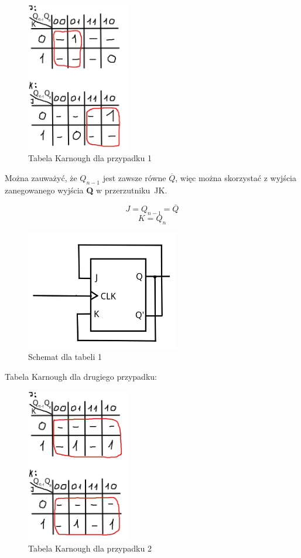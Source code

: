\documentclass{article}
\begin{document}
\begin{figure}[H]
    \centering
    \includegraphics[width=0.4\textwidth]{3a_kar_1.jpg}
    \caption{Tabela Karnough dla przypadku 1}
\end{figure}

Można zauważyć, że $Q_{n-1}$ jest zawsze równe $\overline{Q}$, więc można skorzystać z wyjścia zanegowanego wyjścia \textbf{Q} w przerzutniku\
JK.

$$J=Q_{n-1}=\overline{Q}$$
$$K=Q_n$$

\begin{figure}[H]
    \centering
    \includegraphics[width=0.6\textwidth]{3a_model_1.jpg}
    \caption{Schemat dla tabeli 1}
\end{figure}

\pagebreak
Tabela Karnough dla drugiego przypadku:

\begin{figure}[H]
    \centering
    \includegraphics[width=0.4\textwidth]{3a_kar_2.jpg}
    \caption{Tabela Karnough dla przypadku 2}
\end{figure}
\end{document}
